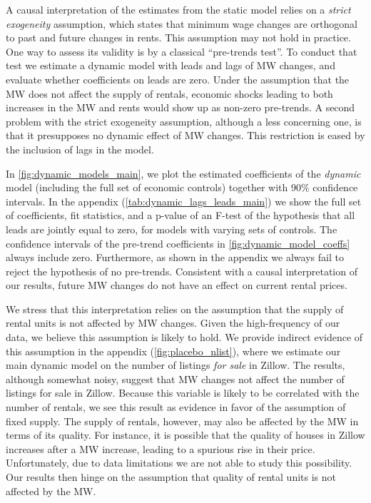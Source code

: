 A causal interpretation of the estimates from the static model relies on a \textit{strict exogeneity} 
assumption, which states that minimum wage changes are orthogonal to past and future changes in rents.
This assumption may not hold in practice. One way to assess its validity is by a classical 
``pre-trends test''. To conduct that test we estimate a dynamic model with leads and lags of MW 
changes, and evaluate whether coefficients on leads are zero. Under the assumption that the MW does 
not affect the supply of rentals, economic shocks leading to both increases in the MW and rents would 
show up as non-zero pre-trends. A second problem with the strict exogeneity assumption, although a less 
concerning one, is that it presupposes no dynamic effect of MW changes. This restriction is eased by 
the inclusion of lags in the model.

In \autoref{fig:dynamic_models_main}, we plot the estimated coefficients of the \textit{dynamic} model 
(including the full set of economic controls) together with 90\% confidence intervals. In the 
appendix (\autoref{tab:dynamic_lags_leads_main}) we show the full set of coefficients, fit 
statistics, and a p-value of an F-test of the hypothesis that all leads are jointly equal to zero, 
for models with varying sets of controls. The confidence intervals of the pre-trend coefficients in 
\autoref{fig:dynamic_model_coeffs} always include zero. Furthermore, as shown in the appendix we 
always fail to reject the hypothesis of no pre-trends. Consistent with a causal interpretation of 
our results, future MW changes do not have an effect on current rental prices. 

We stress that this interpretation relies on the assumption that the supply of rental units is 
not affected by MW changes. Given the high-frequency of our data, we believe this assumption is 
likely to hold. We provide indirect evidence of this assumption in the appendix  
(\autoref{fig:placebo_nlist}), where we estimate our main dynamic model on the number of listings 
\textit{for sale} in Zillow. The results, although somewhat noisy, suggest that MW changes not 
affect the number of listings for sale in Zillow. Because this variable is likely to be correlated 
with the number of rentals, we see this result as evidence in favor of the assumption of fixed supply. 
The supply of rentals, however, may also be affected by the MW in terms of its quality. For instance, 
it is possible that the quality of houses in Zillow increases after a MW increase, leading to a 
spurious rise in their price.  Unfortunately, due to data limitations we are not able to study this 
possibility. Our results then hinge on the assumption that quality of rental units is not affected 
by the MW.

